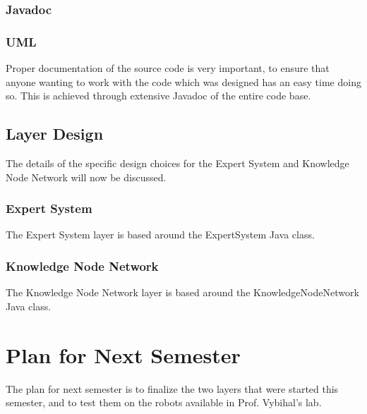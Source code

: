 \documentclass[titlepage,11pt]{article}
\begin{document}
\subsubsection{Javadoc}

\subsubsection{UML}

Proper documentation of the source code is very important, to ensure that anyone wanting to work with the code which was designed has an easy time doing so. This is achieved through extensive Javadoc of the entire code base.

\subsection{Layer Design}

The details of the specific design choices for the Expert System and Knowledge Node Network will now be discussed.

\subsubsection{Expert System}

The Expert System layer is based around the ExpertSystem Java class.

\subsubsection{Knowledge Node Network}

The Knowledge Node Network layer is based around the KnowledgeNodeNetwork Java class.

\section{Plan for Next Semester}

The plan for next semester is to finalize the two layers that were started this semester, and to test them on the robots available in Prof. Vybihal's lab.
\end{document}

